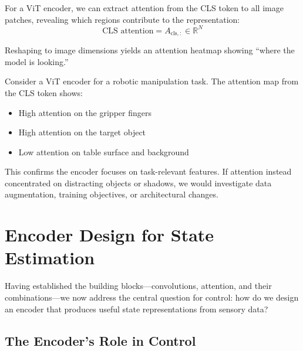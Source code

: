 For a ViT encoder, we can extract attention from the CLS token to all image patches, revealing which regions contribute to the representation:
\begin{equation}
\text{CLS attention} = A_{\text{cls}, :} \in \mathbb{R}^{N}
\label{eq:cls_attention}
\end{equation}

Reshaping to image dimensions yields an attention heatmap showing ``where the model is looking.''


\begin{example}
Consider a ViT encoder for a robotic manipulation task. The attention map from the CLS token shows:
\begin{itemize}
    \item High attention on the gripper fingers
    \item High attention on the target object
    \item Low attention on table surface and background
\end{itemize}

This confirms the encoder focuses on task-relevant features. If attention instead concentrated on distracting objects or shadows, we would investigate data augmentation, training objectives, or architectural changes.
\end{example}

\section{Encoder Design for State Estimation}
\label{sec:encoder_design}

Having established the building blocks---convolutions, attention, and their combinations---we now address the central question for control: how do we design an encoder that produces useful state representations from sensory data?

\subsection{The Encoder's Role in Control}

